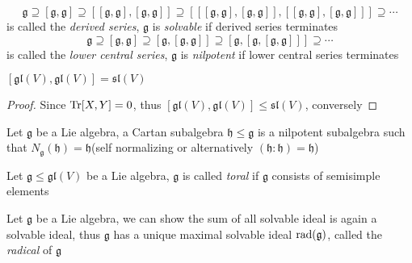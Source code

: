 \documentclass[main]{subfiles}
\begin{document}
\begin{definition}
\[\mathfrak{g}\supseteq[\mathfrak{g},\mathfrak{g}]\supseteq\left[[\mathfrak{g},\mathfrak{g}],[\mathfrak{g},\mathfrak{g}]\right]\supseteq\left[\left[[\mathfrak{g},\mathfrak{g}],[\mathfrak{g},\mathfrak{g}]\right],\left[[\mathfrak{g},\mathfrak{g}],[\mathfrak{g},\mathfrak{g}]\right]\right]\supseteq\cdots\]
is called the \textit{derived series}, $\mathfrak{g}$ is \textit{solvable} if derived series terminates
\[\mathfrak{g}\supseteq[\mathfrak{g},\mathfrak{g}]\supseteq
\left[\mathfrak{g},[\mathfrak{g},\mathfrak{g}]\right]\supseteq
\left[\mathfrak{g},\left[\mathfrak{g},[\mathfrak{g},\mathfrak{g}]\right]\right]\supseteq\cdots\]
is called the \textit{lower central series}, $\mathfrak{g}$ is \textit{nilpotent} if lower central series terminates
\end{definition}

\begin{example}
$[\mathfrak{gl}(V),\mathfrak{gl}(V)]=\mathfrak{sl}(V)$
\end{example}

\begin{proof}
Since $\operatorname{Tr}[X,Y]=0$, thus $[\mathfrak{gl}(V),\mathfrak{gl}(V)]\leq\mathfrak{sl}(V)$, conversely
\end{proof}

\begin{definition}
Let $\mathfrak{g}$ be a Lie algebra, a Cartan subalgebra $\mathfrak{h}\leq\mathfrak{g}$ is a nilpotent subalgebra such that $N_\mathfrak{g}(\mathfrak{h})=\mathfrak{h}$(self normalizing or alternatively $(\mathfrak{h}:\mathfrak{h})=\mathfrak{h}$)
\end{definition}

\begin{definition}
Let $\mathfrak{g}\leq\mathfrak{gl}(V)$ be a Lie algebra, $\mathfrak{g}$ is called \textit{toral} if $\mathfrak{g}$ consists of semisimple elements
\end{definition}

\begin{definition}
Let $\mathfrak{g}$ be a Lie algebra, we can show the sum of all solvable ideal is again a solvable ideal, thus $\mathfrak{g}$ has a unique maximal solvable ideal $\operatorname{rad}(\mathfrak{g})$, called the \textit{radical} of $\mathfrak{g}$
\end{definition}
\end{document}
